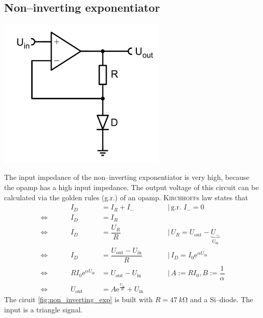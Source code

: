 \documentclass[a4paper,10pt]{article}
\newenvironment{Figure}
        {\par\medskip\noindent\minipage{\linewidth}}
        {\endminipage\par\medskip} %
\numberwithin{equation}{section}
\begin{document}
\begin{multicols}{2}
        \subsection{Non--inverting exponentiator}
        \begin{Figure}
                \centering
                \includegraphics[width=0.6\textwidth]{non_inverting_exp.png} \label{fig:non_inverting_exp}
        \end{Figure}
        The input impedance of the non--inverting exponentiator is very high, because the opamp has a high input impedance.
        The output voltage of this circuit can be calculated via the golden rules (g.r.) of an opamp.
        \textsc{Kirchhoff}s law states that
        \begin{align} 
                 &&&& I_D &= I_R+I_- &&&& \,|\, \text{g.r. }I_-=0\\
                 \Leftrightarrow  &&&& I_D &= I_R &&&& \\
                 \Leftrightarrow  &&&& I_D &= \dfrac{U_R}{R} &&&& \,|\, U_R=U_\text{out}-\underbrace{U_-}_{U_\text{in}}\\
                 \Leftrightarrow  &&&& I_D &= \dfrac{U_\text{out}-U_\text{in}}{R} &&&& \,|\, I_D=I_0\text{e}^{\alpha U_\text{in}}\\
                 \Leftrightarrow  &&&& RI_0\text{e}^{\alpha U_\text{in}} &= U_\text{out}-U_\text{in} &&&& \,|\, A:=RI_0,B:=\dfrac{1}{\alpha }\\
                 \Leftrightarrow  &&&& U_\text{out} &= A\text{e}^{\tfrac{U_\text{in}}{B}}+U_\text{in} &&&& 
        \end{align} 
        The ciruit \ref{fig:non_inverting_exp} is built with $R=\SI{47}{k\ohm}$ and a Si--diode. 
        The input is a triangle signal.

\end{multicols}
\end{document}
